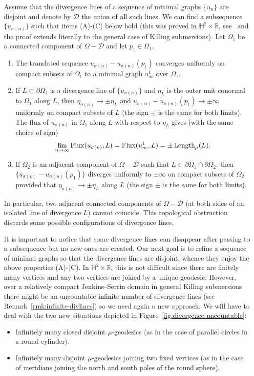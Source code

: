 \documentclass[a4paper,10pt,reqno]{amsart}
\newcommand{\Length}{\mathop{\rm Length}\nolimits}
\newcommand{\Flux}{\mathrm{Flux}}
\newcommand{\sm}{-}
\theoremstyle{definition}
\theoremstyle{remark}
\numberwithin{equation}{section}
\begin{document}
Assume that the divergence lines of a sequence of minimal graphs $\{u_n\}$ are disjoint and denote by $\mathcal D$ the union of all such lines. We can find a subsequence $\{u_{\sigma(n)}\}$ such that items (A)-(C) below hold (this was proved in $\mathbb{H}^2\times\mathbb{R}$, see~\cite[Prop.~4.4, Lemma~4.6, Rmk.~4.7]{MRR} and the proof extends literally to the general case of Killing submersions). Let $\Omega_1$ be a connected component of $\Omega\sm\mathcal D$ and let $p_1\in\Omega_1$.
\begin{enumerate}[label=(\Alph*)]
 	\item The translated sequence $u_{\sigma(n)}-u_{\sigma(n)}(p_1)$ converges uniformly on compact subsets of $\Omega_1$ to a minimal graph $u_\infty^1$ over $\Omega_1$.
 
	\item If $L\subset\partial\Omega_1$ is a divergence line of $\{u_{\sigma(n)}\}$ and $\eta_L$ is the outer unit conormal to $\Omega_1$ along $L$, then $\eta_{\sigma(n)}\to\pm\eta_L$ and $u_{\sigma(n)}-u_{\sigma(n)}(p_1)\to\pm\infty$ uniformly on compact subsets of $L$ (the sign $\pm$ is the same for both limits). The flux of $u_{\sigma(n)}$ in $\Omega_1$ along $L$ with respect to $\eta_L$ gives (with the same choice of sign)
 	\[\lim_{n\to\infty}\Flux(u_{\sigma(n)},L)=\Flux(u_\infty^1,L)=\pm\Length_\mu(L).\]
 	
 	\item If $\Omega_2$ is an adjacent component of $\Omega\sm\mathcal D$ such that $L\subset\partial\Omega_1\cap \partial\Omega_2$, then $\{u_{\sigma(n)}-u_{\sigma(n)}(p_1)\}$ diverges uniformly to $\pm\infty$ on compact subsets of $\Omega_2$ provided that $\eta_{\sigma(n)}\to\pm\eta_L$ along $L$ (the sign $\pm$ is the same for both limits).
\end{enumerate}
In particular, two adjacent connected components of $\Omega\sm\mathcal D$ (at both sides of an isolated line of divergence $L$) cannot coincide. This topological obstruction discards some possible configurations of divergence lines. 

It is important to notice that some divergence lines can disappear after passing to a subsequence but no new ones are created. Our next goal is to refine a sequence of minimal graphs so that the divergence lines are disjoint, whence they enjoy the above properties (A)-(C). In $\mathbb{H}^2\times\mathbb{R}$, this is not difficult since there are finitely many vertices and any two vertices are joined by a unique geodesic. However, over a relatively compact Jenkins--Serrin domain in general Killing submersions there might be an uncountable infinite number of divergence lines (see Remark~\ref{rmk:infinite-divlines}) so we need again a new approach. We will have to deal with the two new situations depicted in Figure~\ref{fig:divergence-uncountable}:
\begin{itemize}
 	\item Infinitely many closed disjoint $\mu$-geodesics (as in the case of parallel circles in a round cylinder).
 	\item Infinitely many disjoint $\mu$-geodesics joining two fixed vertices (as in the case of meridians joining the north and south poles of the round sphere).
 \end{itemize}
\end{document}
